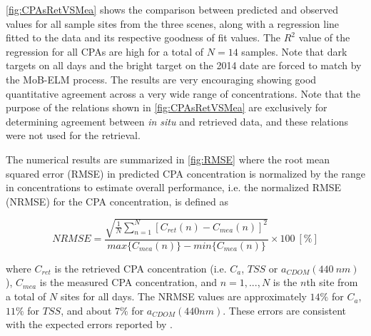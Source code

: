 \documentclass[onecolumn,3p,letterpaper,11pt]{elsarticle}
\begin{document}
\autoref{fig:CPAsRetVSMea} shows the comparison between predicted and observed values for all sample sites from the three scenes, along with a regression line fitted to the data and its respective goodness of fit values. The $R^2$ value of the regression for all CPAs are high for a total of $N=14$ samples. Note that dark targets on all days and the bright target on the 2014 date are forced to match by the MoB-ELM process. The results are very encouraging showing good quantitative agreement across a very wide range of concentrations. Note that the purpose of the relations shown in \autoref{fig:CPAsRetVSMea} are exclusively for determining agreement between {\it in situ} and retrieved data, and these relations were not used for the retrieval.

The numerical results are summarized in \autoref{fig:RMSE} where the root mean squared error (RMSE) in predicted CPA concentration is normalized by the range in concentrations to estimate overall performance, i.e. the normalized RMSE (NRMSE) for the CPA concentration, is defined as

\begin{equation}
\label{eq:error_percentage}
	NRMSE =\frac{\sqrt{\frac{1}{N}\sum_{n=1}^N{\left[C_{ret}(n) - C_{mea}(n)\right]^2}}}{max\{C_{mea}(n)\} - min\{C_{mea}(n)\}}\times100 ~[\%]
\end{equation}

\noindent where $C_{ret}$ is the retrieved CPA concentration (i.e. $C_a$, $TSS$ or $a_{CDOM}(440~nm)$), $C_{mea}$ is the measured CPA concentration, and $n=1,...,N$ is the $n$th site from a total of $N$ sites for all days. The NRMSE values are approximately $14\%$ for $C_a$, $11\%$ for $TSS$, and about $7\%$ for $a_{CDOM}(440nm)$. These errors are consistent with the expected errors reported by \citet{Gerace:2013}. 
\end{document}
